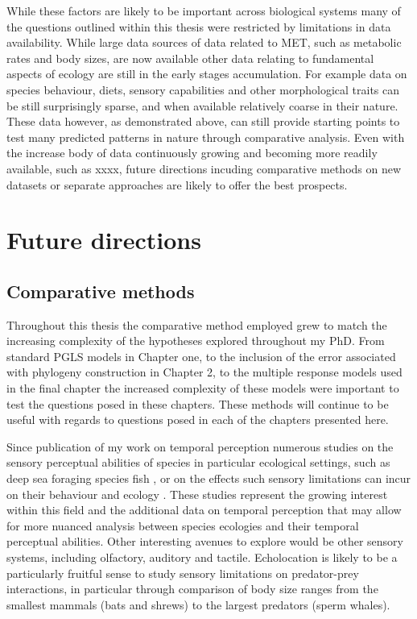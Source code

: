 While these factors are likely to be important across biological systems many of the questions outlined within this thesis were restricted by limitations in data availability. While large data sources of data related to MET, such as metabolic rates and body sizes, are now available other data relating to fundamental aspects of ecology are still in the early stages accumulation. For example data on species behaviour, diets, sensory capabilities and other morphological traits can be still surprisingly sparse, and when available relatively coarse in their nature. These data however, as demonstrated above, can still provide starting points to test many predicted patterns in nature through comparative analysis. Even with the increase body of data continuously growing and becoming more readily available, such as xxxx, future directions incuding comparative methods on new datasets or separate approaches are likely to offer the best prospects. 


\section{\uppercase{F}uture directions}

\subsection{Comparative methods}


Throughout this thesis the comparative method employed grew to match the increasing complexity of the hypotheses explored throughout my PhD. From standard PGLS models in Chapter one, to the inclusion of the error associated with phylogeny construction in Chapter 2, to the multiple response models used in the final chapter the increased complexity of these models were important to test the questions posed in these chapters. These methods will continue to be useful with regards to questions posed in each of the chapters presented here. 

Since publication of my work on temporal perception \citep{healy2013metabolic} numerous studies on the sensory perceptual abilities of species in particular ecological settings, such as deep sea foraging species fish \citep{kalinoski2014spectral,Wegner15052015,landgren2014visual}, or on the effects such sensory limitations can incur on their behaviour and ecology \citep{bar2015sensory,inger2014potential}. These studies represent the growing interest within this field and the additional data on temporal perception that may allow for more nuanced analysis between species ecologies and their temporal perceptual abilities. Other interesting avenues to explore would be other sensory systems, including olfactory, auditory and tactile. Echolocation is likely to be a particularly fruitful sense to study sensory limitations on predator-prey interactions, in particular through comparison of body size ranges from the smallest mammals (bats and shrews) to the largest predators (sperm whales).


